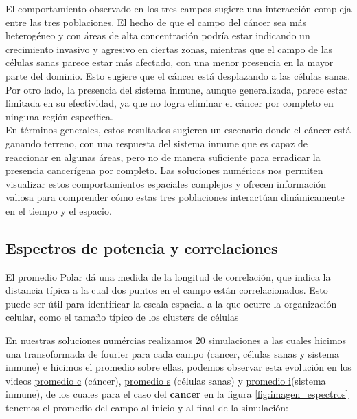 \documentclass{article}
\begin{document}
El comportamiento observado en los tres campos sugiere una interacción compleja entre las tres poblaciones. El hecho de que el campo del cáncer sea más heterogéneo y con áreas de alta concentración podría estar indicando un crecimiento invasivo y agresivo en ciertas zonas, mientras que el campo de las células sanas parece estar más afectado, con una menor presencia en la mayor parte del dominio. Esto sugiere que el cáncer está desplazando a las células sanas. Por otro lado, la presencia del sistema inmune, aunque generalizada, parece estar limitada en su efectividad, ya que no logra eliminar el cáncer por completo en ninguna región específica.
\\

En términos generales, estos resultados sugieren un escenario donde el cáncer está ganando terreno, con una respuesta del sistema inmune que es capaz de reaccionar en algunas áreas, pero no de manera suficiente para erradicar la presencia cancerígena por completo. Las soluciones numéricas nos permiten visualizar estos comportamientos espaciales complejos y ofrecen información valiosa para comprender cómo estas tres poblaciones interactúan dinámicamente en el tiempo y el espacio.

\subsection{Espectros de potencia y correlaciones}

El promedio Polar dá una medida de la longitud de correlación, que indica la distancia típica a la cual dos puntos en el campo están correlacionados. Esto puede ser útil para identificar la escala espacial a la que ocurre la organización celular, como el tamaño típico de los clusters de células


En nuestras soluciones numércias realizamos 20 simulaciones a las cuales hicimos una transoformada de fourier para cada campo (cancer, células sanas y sistema inmune) e hicimos el promedio sobre ellas, podemos observar esta evolución en los videos \href{https://drive.google.com/file/d/18WB3XDmnSowJZG1x9eGgnL-y08Z7FvId/view?usp=sharing}{promedio c} (cáncer), \href{https://drive.google.com/file/d/1eSeVa0LZGAv809gm5wSVChSA5GHmR56Y/view?usp=sharing}{promedio s} (células sanas) y \href{https://drive.google.com/file/d/1itLWUJumwRTS4lQ1mwPHtfOpPGZOBk2B/view?usp=sharing}{promedio i}(sistema inmune), de los cuales para el caso del \textbf{cancer} en la figura \ref{fig:imagen_espectros} tenemos el promedio del campo al inicio y al final de la simulación:
\end{document}
